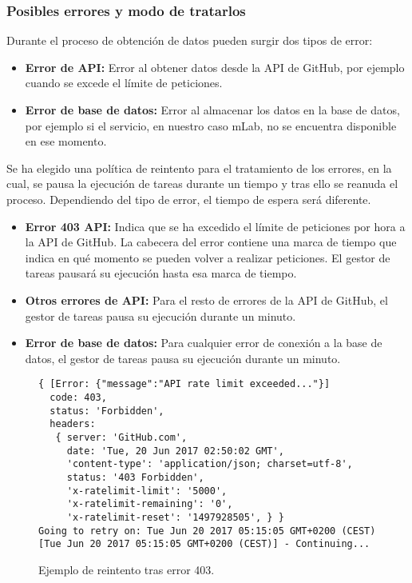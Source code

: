 
\subsubsection{Posibles errores y modo de tratarlos}

Durante el proceso de obtención de datos pueden surgir dos tipos de error:

\begin{itemize}
\tightlist
	\item \textbf{Error de API:} Error al obtener datos desde la API de GitHub, por ejemplo cuando se excede el límite de peticiones.
	\item \textbf{Error de base de datos:} Error al almacenar los datos en la base de datos, por ejemplo si el servicio, en nuestro caso mLab, no se encuentra disponible en ese momento.
\end{itemize}


Se ha elegido una política de reintento para el tratamiento de los errores, en la cual, se pausa la ejecución de tareas durante un tiempo y tras ello se reanuda el proceso. Dependiendo del tipo de error, el tiempo de espera será diferente.

\begin{itemize}
\tightlist
	\item \textbf{Error 403 API:} Indica que se ha excedido el límite de peticiones por hora a la API de GitHub. La cabecera del error contiene una marca de tiempo que indica en qué momento se pueden volver a realizar peticiones. El gestor de tareas pausará su ejecución hasta esa marca de tiempo.
	\item \textbf{Otros errores de API:} Para el resto de errores de la API de GitHub, el gestor de tareas pausa su ejecución durante un minuto.
	\item \textbf{Error de base de datos:} Para cualquier error de conexión a la base de datos, el gestor de tareas pausa su ejecución durante un minuto.
\end{itemize}

\begin{figure}[H]
\begin{verbatim}
{ [Error: {"message":"API rate limit exceeded..."}]
  code: 403,
  status: 'Forbidden',
  headers: 
   { server: 'GitHub.com',
     date: 'Tue, 20 Jun 2017 02:50:02 GMT',
     'content-type': 'application/json; charset=utf-8',
     status: '403 Forbidden',
     'x-ratelimit-limit': '5000',
     'x-ratelimit-remaining': '0',
     'x-ratelimit-reset': '1497928505', } }
Going to retry on: Tue Jun 20 2017 05:15:05 GMT+0200 (CEST)
[Tue Jun 20 2017 05:15:05 GMT+0200 (CEST)] - Continuing...
\end{verbatim}
\caption{Ejemplo de reintento tras error 403.} 
\label{reintento-error-403}
\end{figure}

